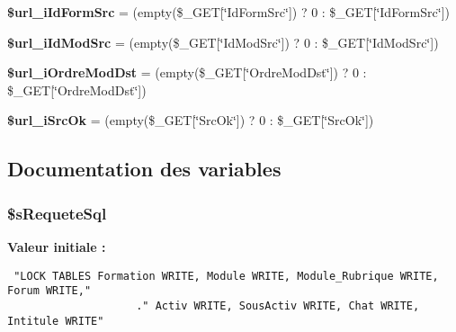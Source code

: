 \begin{CompactItemize}
\item 
\textbf{\$url\_\-iIdFormSrc} = (empty(\$\_\-GET[\char`\"{}IdFormSrc\char`\"{}]) ? 0 : \$\_\-GET[\char`\"{}IdFormSrc\char`\"{}])\label{copie__mod_8php_7d23b6d8e8be4b72aec972efac946e63}

\item 
\textbf{\$url\_\-iIdModSrc} = (empty(\$\_\-GET[\char`\"{}IdModSrc\char`\"{}]) ? 0 : \$\_\-GET[\char`\"{}IdModSrc\char`\"{}])\label{copie__mod_8php_404de3ff18f4725fee13ab25d228dfd4}

\item 
\textbf{\$url\_\-iOrdreModDst} = (empty(\$\_\-GET[\char`\"{}OrdreModDst\char`\"{}]) ? 0 : \$\_\-GET[\char`\"{}OrdreModDst\char`\"{}])\label{copie__mod_8php_843c44ae6202f7374f8a8999cfcf57bf}

\item 
\textbf{\$url\_\-iSrcOk} = (empty(\$\_\-GET[\char`\"{}SrcOk\char`\"{}]) ? 0 : \$\_\-GET[\char`\"{}SrcOk\char`\"{}])\label{copie__mod_8php_b57149b16534096f0ca81cd8e78fa958}

\end{CompactItemize}


\subsection{Documentation des variables}
\subsubsection{\setlength{\rightskip}{0pt plus 5cm}\$sRequeteSql}\label{copie__mod_8php_7fd44c997b9477ef9cf33ccb4eb5545e}


\textbf{Valeur initiale :}

\begin{Code}\begin{verbatim} "LOCK TABLES Formation WRITE, Module WRITE, Module_Rubrique WRITE, Forum WRITE,"
                    ." Activ WRITE, SousActiv WRITE, Chat WRITE, Intitule WRITE"
\end{verbatim}
\end{Code}
